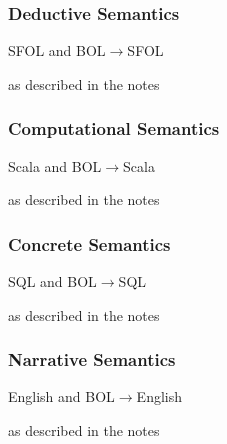 \begin{frame}\frametitle{Deductive Semantics}
SFOL and BOL$\to$SFOL

as described in the notes
\end{frame}

\begin{frame}\frametitle{Computational Semantics}
Scala and BOL$\to$Scala

as described in the notes
\end{frame}

\begin{frame}\frametitle{Concrete Semantics}
SQL and BOL$\to$SQL

as described in the notes
\end{frame}

\begin{frame}\frametitle{Narrative Semantics}
English and BOL$\to$English

as described in the notes
\end{frame}
